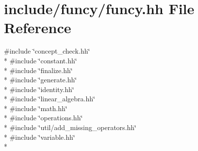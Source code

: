 \hypertarget{funcy_8hh}{\section{include/funcy/funcy.hh File Reference}
\label{funcy_8hh}
}
{\ttfamily \#include \char`\"{}concept\-\_\-check.\-hh\char`\"{}}\\*
{\ttfamily \#include \char`\"{}constant.\-hh\char`\"{}}\\*
{\ttfamily \#include \char`\"{}finalize.\-hh\char`\"{}}\\*
{\ttfamily \#include \char`\"{}generate.\-hh\char`\"{}}\\*
{\ttfamily \#include \char`\"{}identity.\-hh\char`\"{}}\\*
{\ttfamily \#include \char`\"{}linear\-\_\-algebra.\-hh\char`\"{}}\\*
{\ttfamily \#include \char`\"{}math.\-hh\char`\"{}}\\*
{\ttfamily \#include \char`\"{}operations.\-hh\char`\"{}}\\*
{\ttfamily \#include \char`\"{}util/add\-\_\-missing\-\_\-operators.\-hh\char`\"{}}\\*
{\ttfamily \#include \char`\"{}variable.\-hh\char`\"{}}\\*
